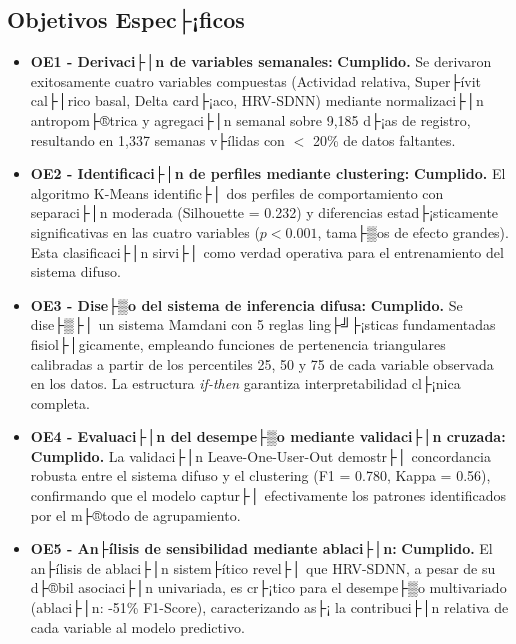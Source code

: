 \subsection{Objetivos Espec├¡ficos}
\label{subsec:cumplimiento_oe}

\begin{itemize}
    \item \textbf{OE1 - Derivaci├│n de variables semanales:} \textbf{Cumplido.} Se derivaron exitosamente cuatro variables compuestas (Actividad relativa, Super├ívit cal├│rico basal, Delta card├¡aco, HRV-SDNN) mediante normalizaci├│n antropom├®trica y agregaci├│n semanal sobre 9,185 d├¡as de registro, resultando en 1,337 semanas v├ílidas con $<$ 20\% de datos faltantes.
    
    \item \textbf{OE2 - Identificaci├│n de perfiles mediante clustering:} \textbf{Cumplido.} El algoritmo K-Means identific├│ dos perfiles de comportamiento con separaci├│n moderada (Silhouette = 0.232) y diferencias estad├¡sticamente significativas en las cuatro variables ($p < 0.001$, tama├▒os de efecto grandes). Esta clasificaci├│n sirvi├│ como verdad operativa para el entrenamiento del sistema difuso.
    
    \item \textbf{OE3 - Dise├▒o del sistema de inferencia difusa:} \textbf{Cumplido.} Se dise├▒├│ un sistema Mamdani con 5 reglas ling├╝├¡sticas fundamentadas fisiol├│gicamente, empleando funciones de pertenencia triangulares calibradas a partir de los percentiles 25, 50 y 75 de cada variable observada en los datos. La estructura \textit{if-then} garantiza interpretabilidad cl├¡nica completa.
    
    \item \textbf{OE4 - Evaluaci├│n del desempe├▒o mediante validaci├│n cruzada:} \textbf{Cumplido.} La validaci├│n Leave-One-User-Out demostr├│ concordancia robusta entre el sistema difuso y el clustering (F1 = 0.780, Kappa = 0.56), confirmando que el modelo captur├│ efectivamente los patrones identificados por el m├®todo de agrupamiento.
    
    \item \textbf{OE5 - An├ílisis de sensibilidad mediante ablaci├│n:} \textbf{Cumplido.} El an├ílisis de ablaci├│n sistem├ítico revel├│ que HRV-SDNN, a pesar de su d├®bil asociaci├│n univariada, es cr├¡tico para el desempe├▒o multivariado (ablaci├│n: -51\% F1-Score), caracterizando as├¡ la contribuci├│n relativa de cada variable al modelo predictivo.
\end{itemize}

